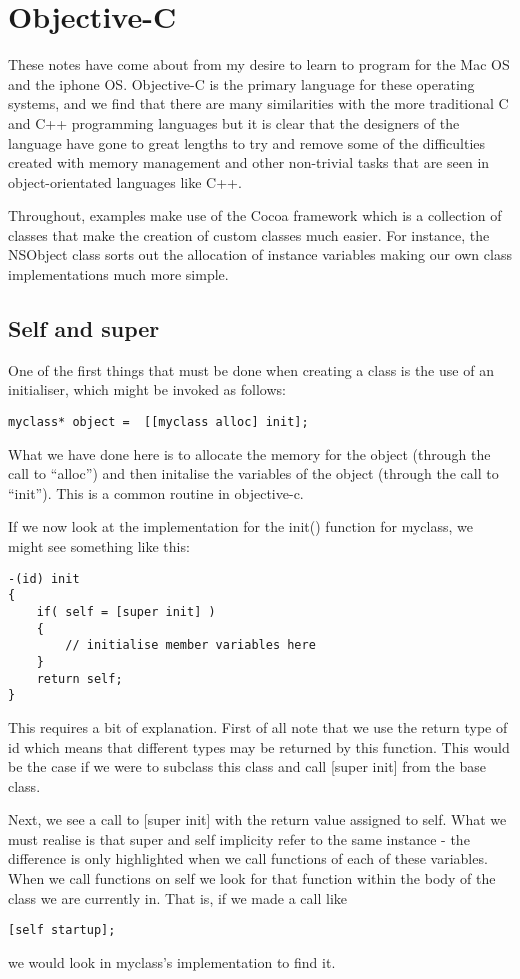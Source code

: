
\chapter{Objective-C}
\label{cha:objective-c}

These notes have come about from my desire to learn to program for the Mac OS and the iphone OS. Objective-C is the primary language for these operating systems, and we find that there are many similarities with the more traditional C and C++ programming languages but it is clear that the designers of the language have gone to great lengths to try and remove some of the difficulties created with memory management and other non-trivial tasks that are seen in object-orientated languages like C++.

Throughout, examples make use of the Cocoa framework which is a collection of classes that make the creation of custom classes much easier. For instance, the NSObject class sorts out the allocation of instance variables making our own class implementations much more simple.

\section{Self and super}
\label{sec:self-super}

One of the first things that must be done when creating a class is the use of an initialiser, which might be invoked as follows:
\begin{lstlisting}
myclass* object =  [[myclass alloc] init];
\end{lstlisting}
What we have done here is to allocate the memory for the object (through the call to ``alloc'') and then initalise the variables of the object (through the call to ``init''). This is a common routine in objective-c.

If we now look at the implementation for the init() function for myclass, we might see something like this:
\begin{lstlisting}
-(id) init
{
	if( self = [super init] )
	{
		// initialise member variables here
	}
	return self;
}
\end{lstlisting}
This requires a bit of explanation. First of all note that we use the return type of id which means that different types may be returned by this function. This would be the case if we were to subclass this class and call [super init] from the base class.

Next, we see a call to [super init] with the return value assigned to self. What we must realise is that super and self implicity refer to the same instance - the difference is only highlighted when we call functions of each of these variables. When we call functions on self we look for that function within the body of the class we are currently in. That is, if we made a call like
\begin{lstlisting}
[self startup];
\end{lstlisting}
we would look in myclass's implementation to find it. 

